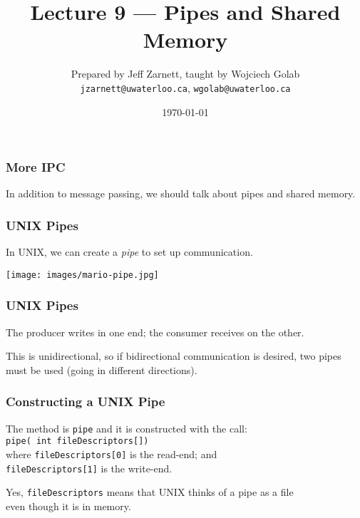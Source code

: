 

\title{Lecture 9 --- Pipes and Shared Memory}

\author{Prepared by Jeff Zarnett, taught by Wojciech Golab \\ \small \texttt{jzarnett@uwaterloo.ca}, \texttt{wgolab@uwaterloo.ca}}
\date{\today}




\begin{frame}
	\titlepage

\end{frame}

\begin{frame}
	\frametitle{More IPC}

	In addition to message passing, we should talk about pipes and shared memory.


\end{frame}


\begin{frame}
	\frametitle{UNIX Pipes}

	In UNIX, we can create a \textit{pipe} to set up communication.

	\begin{center}
		\texttt{[image: images/mario-pipe.jpg]}
	\end{center}

\end{frame}

\begin{frame}
	\frametitle{UNIX Pipes}




	The producer writes in one end; the consumer receives on the other.

	This is unidirectional, so if bidirectional communication is desired, two pipes must be used (going in different directions).

\end{frame}

\begin{frame}
	\frametitle{Constructing a UNIX Pipe}

	The method is \texttt{pipe} and it is constructed with the call: \\
	\texttt{pipe( int fileDescriptors[])}\\
	\quad where \texttt{fileDescriptors[0]} is the read-end; and\\
	\quad \texttt{fileDescriptors[1]} is the write-end.

	Yes, \texttt{fileDescriptors} means that UNIX thinks of a pipe as a file\\
	\quad even though it is in memory.


\end{frame}

